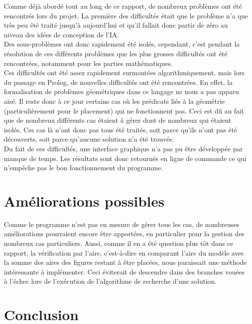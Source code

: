 \documentclass[a4paper, 11pt]{report}
\begin{document}
	Comme déjà abordé tout au long de ce rapport, de nombreux problèmes ont été rencontrés lors du projet. La première des difficultés était que le problème n'a que très peu été traité jusqu'à aujourd'hui et qu'il fallait donc partir de zéro au niveau des idées de conception de l'IA.\\
	Des sous-problèmes ont donc rapidement été isolés, cependant, c'est pendant la résolution de ces différents problèmes que les plus grosses difficultés ont été rencontrées, notamment pour les parties mathématiques.\\
	Ces difficultés ont été assez rapidement surmontées algorithmiquement, mais lors du passage en Prolog, de nouvelles difficultés ont été rencontrées. En effet, la formalisation de problèmes géométriques dans ce langage ne nous a pas apparu aisé. Il reste donc à ce jour certains cas où les prédicats liés à la géométrie (particulièrement pour le placement) qui ne fonctionnent pas. Ceci est dû au fait que de nombreux différents cas étaient à gérer dont de nombreux qui étaient isolés. Ces cas là n'ont donc pas tous été traités, soit parce qu'ils n'ont pas été découverts, soit parce qu'aucune solution n'a été trouvée.\\
	Du fait de ces difficultés, une interface graphique n'a pas pu être développée par manque de temps. Les résultats sont donc retournés en ligne de commande ce qui n'empêche pas le bon fonctionnement du programme.
	
	\chapter{Améliorations possibles}
	
	Comme le programme n'est pas en mesure de gérer tous les cas, de nombreuses améliorations pourraient encore \^etre apportées, en particulier pour la gestion des nombreux cas particuliers. Aussi, comme il en a été question plus t\^ot dans ce rapport, la vérification par l'aire, c'est-à-dire en comparant l'aire du modèle avec la somme des aires des figures restant à \^etre placées, nous paraissait une méthode intéressante à implémenter. Ceci éviterait de descendre dans des branches vouées à l’échec lors de l'exécution de l'algorithme de recherche d'une solution.
	
	\chapter*{Conclusion}
	
\end{document}
